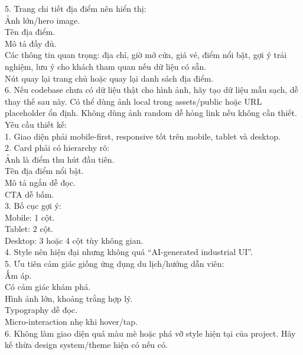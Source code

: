 \begin{enumerate}
5. Trang chi tiết địa điểm nên hiển thị: \\
\* Ảnh lớn/hero image. \\
\* Tên địa điểm. \\
\* Mô tả đầy đủ. \\
\* Các thông tin quan trọng: địa chỉ, giờ mở cửa, giá vé, điểm nổi bật, gợi ý trải nghiệm, lưu ý cho khách tham quan nếu dữ liệu có sẵn. \\
\* Nút quay lại trang chủ hoặc quay lại danh sách địa điểm. \\

6. Nếu codebase chưa có dữ liệu thật cho hình ảnh, hãy tạo dữ liệu mẫu sạch, dễ thay thế sau này. Có thể dùng ảnh local trong assets/public hoặc URL placeholder ổn định. Không dùng ảnh random dễ hỏng link nếu không cần thiết. \\

Yêu cầu thiết kế: \\

1. Giao diện phải mobile-first, responsive tốt trên mobile, tablet và desktop. \\
2. Card phải có hierarchy rõ: \\
\* Ảnh là điểm thu hút đầu tiên. \\
\* Tên địa điểm nổi bật. \\
\* Mô tả ngắn dễ đọc. \\
\* CTA dễ bấm. \\

3. Bố cục gợi ý: \\
\* Mobile: 1 cột. \\
\* Tablet: 2 cột. \\
\* Desktop: 3 hoặc 4 cột tùy không gian. \\

4. Style nên hiện đại nhưng không quá “AI-generated industrial UI”. \\
5. Ưu tiên cảm giác giống ứng dụng du lịch/hướng dẫn viên: \\
\* Ấm áp. \\
\* Có cảm giác khám phá. \\
\* Hình ảnh lớn, khoảng trắng hợp lý. \\
\* Typography dễ đọc. \\
\* Micro-interaction nhẹ khi hover/tap. \\

6. Không làm giao diện quá màu mè hoặc phá vỡ style hiện tại của project. Hãy kế thừa design system/theme hiện có nếu có. \\


\end{enumerate}

